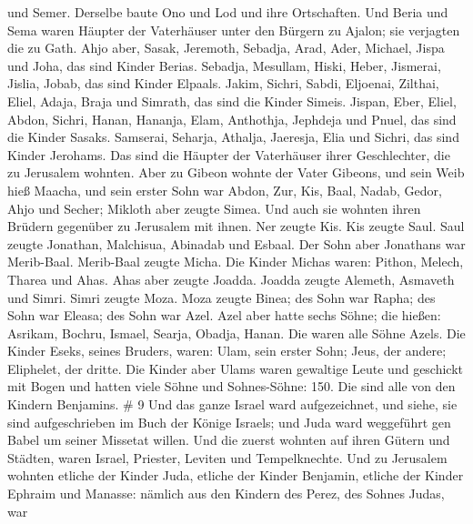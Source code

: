 und Semer. Derselbe baute Ono und Lod und ihre Ortschaften.
 Und Beria und Sema waren Häupter der Vaterhäuser unter den
Bürgern zu Ajalon; sie verjagten die zu Gath.  Ahjo aber,
Sasak, Jeremoth,  Sebadja, Arad, Ader, 
Michael, Jispa und Joha, das sind Kinder Berias.  Sebadja,
Mesullam, Hiski, Heber,  Jismerai, Jislia, Jobab, das sind
Kinder Elpaals.  Jakim, Sichri, Sabdi, 
Eljoenai, Zilthai, Eliel,  Adaja, Braja und Simrath, das
sind die Kinder Simeis.  Jispan, Eber, Eliel, 
Abdon, Sichri, Hanan,  Hananja, Elam, Anthothja,
 Jephdeja und Pnuel, das sind die Kinder Sasaks.
 Samserai, Seharja, Athalja,  Jaeresja, Elia
und Sichri, das sind Kinder Jerohams.  Das sind die Häupter
der Vaterhäuser ihrer Geschlechter, die zu Jerusalem wohnten.
 Aber zu Gibeon wohnte der Vater Gibeons, und sein Weib
hieß Maacha,  und sein erster Sohn war Abdon, Zur, Kis,
Baal, Nadab,  Gedor, Ahjo und Secher;  Mikloth
aber zeugte Simea. Und auch sie wohnten ihren Brüdern gegenüber zu
Jerusalem mit ihnen.  Ner zeugte Kis. Kis zeugte Saul. Saul
zeugte Jonathan, Malchisua, Abinadab und Esbaal.  Der Sohn
aber Jonathans war Merib-Baal. Merib-Baal zeugte Micha. 
Die Kinder Michas waren: Pithon, Melech, Tharea und Ahas. 
Ahas aber zeugte Joadda. Joadda zeugte Alemeth, Asmaveth und Simri.
Simri zeugte Moza.  Moza zeugte Binea; des Sohn war Rapha;
des Sohn war Eleasa; des Sohn war Azel.  Azel aber hatte
sechs Söhne; die hießen: Asrikam, Bochru, Ismael, Searja, Obadja, Hanan.
Die waren alle Söhne Azels.  Die Kinder Eseks, seines
Bruders, waren: Ulam, sein erster Sohn; Jeus, der andere; Eliphelet, der
dritte.  Die Kinder aber Ulams waren gewaltige Leute und
geschickt mit Bogen und hatten viele Söhne und Sohnes-Söhne: 150. Die
sind alle von den Kindern Benjamins. \# 9  Und das ganze
Israel ward aufgezeichnet, und siehe, sie sind aufgeschrieben im Buch
der Könige Israels; und Juda ward weggeführt gen Babel um seiner
Missetat willen.  Und die zuerst wohnten auf ihren Gütern
und Städten, waren Israel, Priester, Leviten und Tempelknechte.
 Und zu Jerusalem wohnten etliche der Kinder Juda, etliche
der Kinder Benjamin, etliche der Kinder Ephraim und Manasse:
 nämlich aus den Kindern des Perez, des Sohnes Judas, war
